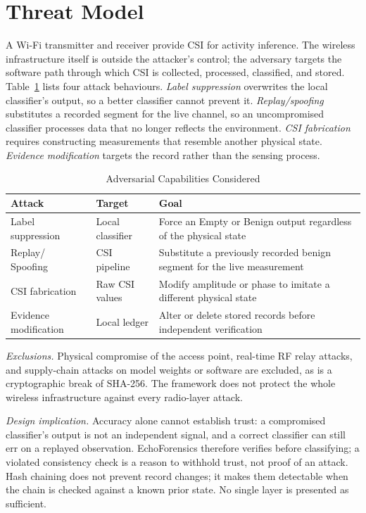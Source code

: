 \documentclass[conference]{IEEEtran}
\begin{document}
\section{Threat Model}
A Wi-Fi transmitter and receiver provide CSI for activity inference. The wireless infrastructure itself is outside the attacker's control; the adversary targets the software path through which CSI is collected, processed, classified, and stored. Table~\ref{tab:attacks} lists four attack behaviours. \emph{Label suppression} overwrites the local classifier's output, so a better classifier cannot prevent it. \emph{Replay/spoofing} substitutes a recorded segment for the live channel, so an uncompromised classifier processes data that no longer reflects the environment. \emph{CSI fabrication} requires constructing measurements that resemble another physical state. \emph{Evidence modification} targets the record rather than the sensing process.

\begin{table}[t]
\caption{Adversarial Capabilities Considered}
\label{tab:attacks}
\centering
\small
\begin{tabular}{p{1.45cm}p{1.35cm}p{4.0cm}}
\toprule
Attack & Target & Goal \\
\midrule
Label suppression & Local classifier & Force an Empty or Benign output regardless of the physical state \\
\shortstack[l]{Replay/\\Spoofing} & CSI pipeline & Substitute a previously recorded benign segment for the live measurement \\
CSI fabrication & Raw CSI values & Modify amplitude or phase to imitate a different physical state \\
Evidence modification & Local ledger & Alter or delete stored records before independent verification \\
\bottomrule
\end{tabular}
\end{table}

\emph{Exclusions.} Physical compromise of the access point, real-time RF relay attacks, and supply-chain attacks on model weights or software are excluded, as is a cryptographic break of SHA-256. The framework does not protect the whole wireless infrastructure against every radio-layer attack.

\emph{Design implication.} Accuracy alone cannot establish trust: a compromised classifier's output is not an independent signal, and a correct classifier can still err on a replayed observation. EchoForensics therefore verifies before classifying; a violated consistency check is a reason to withhold trust, not proof of an attack. Hash chaining does not prevent record changes; it makes them detectable when the chain is checked against a known prior state. No single layer is presented as sufficient.
\end{document}
